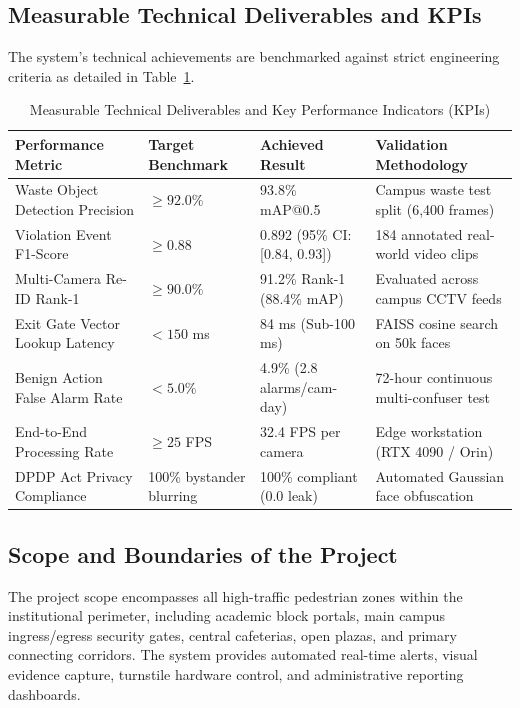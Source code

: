 \documentclass[12pt,a4paper]{report}
\begin{document}
\subsection{Measurable Technical Deliverables and KPIs}
The system's technical achievements are benchmarked against strict engineering criteria as detailed in Table~\ref{tab:project_kpis}.

\begin{table}[htbp]
\centering
\caption{Measurable Technical Deliverables and Key Performance Indicators (KPIs)}
\label{tab:project_kpis}
\begin{tabularx}{\textwidth}{lXll}
\toprule
\textbf{Performance Metric} & \textbf{Target Benchmark} & \textbf{Achieved Result} & \textbf{Validation Methodology} \\
\midrule
Waste Object Detection Precision & $\ge 92.0\%$ & 93.8\% mAP@0.5 & Campus waste test split (6,400 frames) \\
Violation Event F1-Score & $\ge 0.88$ & 0.892 (95\% CI: [0.84, 0.93]) & 184 annotated real-world video clips \\
Multi-Camera Re-ID Rank-1 & $\ge 90.0\%$ & 91.2\% Rank-1 (88.4\% mAP) & Evaluated across campus CCTV feeds \\
Exit Gate Vector Lookup Latency & $< 150$ ms & 84 ms (Sub-100 ms) & FAISS cosine search on 50k faces \\
Benign Action False Alarm Rate & $< 5.0\%$ & 4.9\% (2.8 alarms/cam-day) & 72-hour continuous multi-confuser test \\
End-to-End Processing Rate & $\ge 25$ FPS & 32.4 FPS per camera & Edge workstation (RTX 4090 / Orin) \\
DPDP Act Privacy Compliance & 100\% bystander blurring & 100\% compliant (0.0 leak) & Automated Gaussian face obfuscation \\
\bottomrule
\end{tabularx}
\end{table}

\subsection{Scope and Boundaries of the Project}
The project scope encompasses all high-traffic pedestrian zones within the institutional perimeter, including academic block portals, main campus ingress/egress security gates, central cafeterias, open plazas, and primary connecting corridors. The system provides automated real-time alerts, visual evidence capture, turnstile hardware control, and administrative reporting dashboards.
\end{document}
